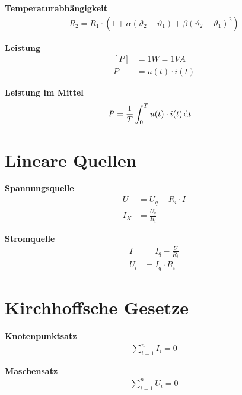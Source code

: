 \textbf{Temperaturabhängigkeit}
\begin{align*}
R_2=R_1\cdot\left(1+\alpha\left(\vartheta_2-\vartheta_1\right)+\beta\left(\vartheta_2-\vartheta_1\right)^2\right)
\end{align*}


\begin{multicols}{2}{}
\textbf{Leistung}
\begin{align*}
\left[P\right]&=1W=1VA\\
P&=u(t)\cdot i(t)
\end{align*}

\textbf{Leistung im Mittel}
\begin{align*}
P&=\frac{1}{T}\int_0^T u(t)\cdot i(t)\mathop{}\!\mathrm{d} t 
\end{align*}
\hfill
\end{multicols}


\section{Lineare Quellen}


\begin{multicols}{2}{}
\textbf{Spannungsquelle}
\begin{align*}
U&=U_q-R_i\cdot I\\
I_K&=\frac{U_q}{R_i}
\end{align*}

\textbf{Stromquelle}
\begin{align*}
I&=I_q-\frac{U}{R_i}\\
U_l&=I_q\cdot R_i
\end{align*}
\end{multicols}


\section{Kirchhoffsche Gesetze}
\begin{multicols}{2}{}
\textbf{Knotenpunktsatz}
\begin{align*}
\sum_{i=1}^n I_i=0
\end{align*}

\textbf{Maschensatz}
\begin{align*}
\sum_{i=1}^n U_i=0
\end{align*}
\end{multicols}
